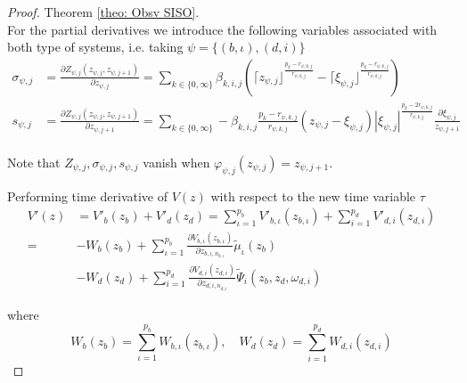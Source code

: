 \documentclass[11pt,letterpaper,twoside,openright]{report}
\begin{document}
\begin{proof}{Theorem \ref{theo: Obsv SISO}. \\}
	For the partial derivatives we introduce the following variables associated with both type of systems, i.e. taking $\psi=\{(b,\iota),(d,i)\}$
		\begin{equation}
		\begin{split}\label{ecu: CH4 sigma y s}
			\sigma_{\psi,j} &= \frac{\partial Z_{\psi,j}(z_{\psi,j},z_{\psi,j+1})}{\partial z_{\psi,j}} = \displaystyle\sum_{k\in \{0,\infty\}}^{} \beta_{k,i,j} \left(
			\lceil z_{\psi,j} \rfloor^{\frac{p_{k}-r_{\psi,k,j}}{r_{\psi,k,j}}} - \lceil \xi_{\psi,j} \rfloor^{\frac{p_{k}-r_{\psi,k,j}}{r_{\psi,k,j}}}    \right)\\
			s_{\psi,j}&=\frac{\partial Z_{\psi,j}(z_{\psi,j},z_{\psi,j+1})}{\partial z_{\psi,j+1}} = \displaystyle\sum_{k\in \{0,\infty\}}^{} 		-\beta_{k,i,j}\frac{p_k-r_{\psi,k,j}}{r_{\psi,k,j}}(z_{\psi,j}-\xi_{\psi,j})|\xi_{\psi,j}|^{\frac{p_k-2r_{\psi,k,j}}{r_{\psi,k,j}}} \frac{\partial \xi_{\psi,j}}{z_{\psi,j+1}}\\
		\end{split}
		\end{equation}
	
	Note that $Z_{\psi,j},\sigma_{\psi,j},s_{\psi,j}$ vanish when $\varphi_{\psi,j}(z_{\psi,j})=z_{\psi,j+1}$.
	
	Performing time derivative of $V(z)$ with respect to the new time variable $\tau$
	\begin{equation}
		\begin{split}\label{ecu: CH4 V_prima}
			V'(z)&=V'_b(z_b)+V'_d(z_d) = \sum_{\iota=1}^{p_b}V'_{b,\iota}(z_{b,\iota}) + \sum_{i=1}^{p_d}V'_{d,i}(z_{d,i}) \\
			= &-W_b(z_b) + \sum_{\iota=1}^{p_b} \frac{\partial V_{b,\iota}(z_{b,\iota})}{\partial z_{b,\iota,n_{b,\iota}}}\tilde{\mu}_{\iota}(z_b)\\
			&-W_d(z_d) + \sum_{i=1}^{p_d}\frac{\partial V_{d,i}(z_{d,i})}{\partial z_{d,i,n_{d,i}}}\tilde{\Psi}_{i}(z_b,z_d,\omega_{d,i})
		\end{split}
	\end{equation}
	
	where
	\begin{equation}\label{ecu: CH4 Wb,Wd}
		W_b(z_b) = \sum_{\iota=1}^{p_b} W_{b,\iota}(z_{b,\iota}), \quad 
			W_d(z_d) = \sum_{i=1}^{p_d} W_{d,i}(z_{d,i})
	\end{equation}


\end{proof}
\end{document}
